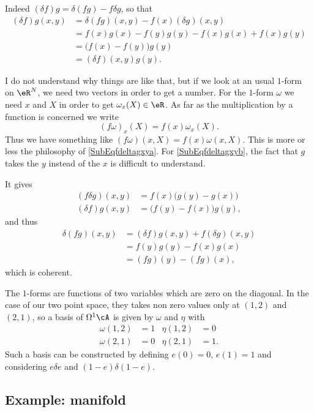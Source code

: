 Indeed $(\delta f)g=\delta(fg)-f\delta g$, so that
\begin{align*}
(\delta f)g(x,y)&=\delta(fg)(x,y)-f(x)(\delta g)(x,y)\\
		&=f(x)g(x)-f(y)g(y)-f(x)g(x)+f(x)g(y)\\
		&=\big( f(x)-f(y) \big)g(y)\\
		&=(\delta f)(x,y)g(y).
\end{align*}

\begin{probleme}
	I do not understand why things are like that, but if we look at an usual $1$-form on $\eR^N$, we need two vectors in order to get a number. For the $1$-form $\omega$ we need $x$ and $X$ in order to get $\omega_x(X)\in\eR$. As far as the multiplication by a function is concerned we write
\[
  (f\omega)_{x}(X)=f(x)\omega_{x}(X).
\]
Thus we have something like $(f\omega)(x,X)=f(x)\omega(x,X)$. This is more or less the philosophy of \eqref{SubEqfdeltagxya}. For \eqref{SubEqfdeltagxyb}, the fact that $g$ takes the $y$ instead of the $x$ is difficult to understand.
\end{probleme}
It gives
\begin{subequations}
\begin{align}
  (f\delta g)(x,y)&=f(x)\big( g(y)-g(x) \big)\\
 (\delta f)g(x,y)&=\big( f(y)-f(x) \big)g(y),
\end{align}
\end{subequations}
and thus
\begin{align*}
\delta(fg)(x,y)&=(\delta f)g(x,y)+f(\delta g)(x,y)\\
		&=f(y)g(y)-f(x)g(x)\\
		&=(fg)(y)-(fg)(x),
\end{align*}
which is coherent.

The $1$-forms are functions of two variables which are zero on the diagonal. In the case of our two point space, they takes non zero values only at $(1,2)$ and $(2,1)$, so a basis of $\Omega^1\cA$ is given by $\omega$ and $\eta$ with
\begin{align}
\omega(1,2)&=1 &\eta(1,2)&=0\\
\omega(2,1)&=0 &\eta(2,1)&=1.
\end{align}
Such a basis can be constructed by defining $e(0)=0$, $e(1)=1$ and considering $e\delta e$ and $(1-e)\delta(1-e)$.

\subsection{Example: manifold}

